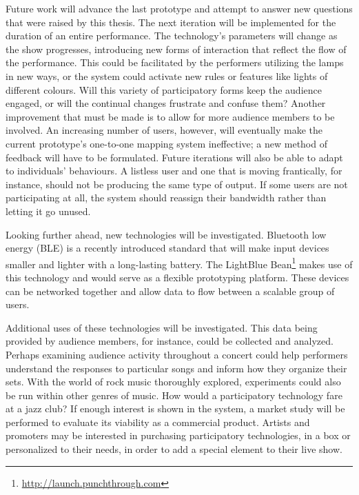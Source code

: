 Future work will advance the last prototype and attempt to answer new questions that were raised by this thesis. The next iteration will be implemented for the duration of an entire performance. The technology's parameters will change as the show progresses, introducing new forms of interaction that reflect the flow of the performance. This could be facilitated by the performers utilizing the lamps in new ways, or the system could activate new rules or features like lights of different colours. Will this variety of participatory forms keep the audience engaged, or will the continual changes frustrate and confuse them? Another improvement that must be made is to allow for more audience members to be involved. An increasing number of users, however, will eventually make the current prototype's one-to-one mapping system ineffective; a new method of feedback will have to be formulated. Future iterations will also be able to adapt to individuals' behaviours. A listless user and one that is moving frantically, for instance, should not be producing the same type of output. If some users are not participating at all, the system should reassign their bandwidth rather than letting it go unused.

Looking further ahead, new technologies will be investigated. Bluetooth low energy (BLE) is a recently introduced standard that will make input devices smaller and lighter with a long-lasting battery. The LightBlue Bean\footnote{\url{http://launch.punchthrough.com}} makes use of this technology and would serve as a flexible prototyping platform. These devices can be networked together and allow data to flow between a scalable group of users.

Additional uses of these technologies will be investigated. This data being provided by audience members, for instance, could be collected and analyzed. Perhaps examining audience activity throughout a concert could help performers understand the responses to particular songs and inform how they organize their sets. With the world of rock music thoroughly explored, experiments could also be run within other genres of music. How would a participatory technology fare at a jazz club? If enough interest is shown in the system, a market study will be performed to evaluate its viability as a commercial product. Artists and promoters may be interested in purchasing participatory technologies, in a box or personalized to their needs, in order to add a special element to their live show.


